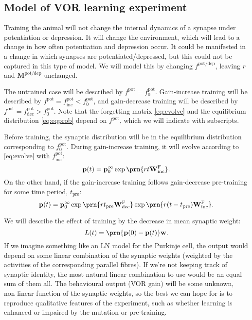 \documentclass[12pt]{article}
\newcommand{\pr}{\mathbf{p}}
\newcommand{\eq}{\pr^\infty}
\newcommand{\w}{\mathbf{w}}
\newcommand{\W}{\mathbf{W}}
\newcommand{\frg}{\W^\mathrm{F}}
\newcommand{\M}{\mathbf{M}}
\newcommand{\pot}{^{\text{pot}}}
\newcommand{\potdep}{^{\text{pot/dep}}}
\newcommand{\norm}{_0}
\newcommand{\inc}{_{\text{inc}}}
\newcommand{\dec}{_{\text{dec}}}
\newcommand{\tpre}{t_{\text{pre}}}
\begin{document}
\subsection{Model of VOR learning experiment}\label{sec:learning}

Training the animal will not change the internal dynamics of a synapse under potentiation or depression.
It will change the environment, which will lead to a change in how often potentiation and depression occur.
It could be manifested in a change in which synapses are potentiated/depressed, but this could not be captured in this type of model.
We will model this by changing $f\potdep$, leaving $r$ and $\M\potdep$ unchanged.

The untrained case will be described by $f\pot=f\pot\norm$.
Gain-increase training  will be described by $f\pot=f\pot\inc<f\pot\norm$, and
gain-decrease training  will be described by $f\pot=f\pot\dec>f\pot\norm$. Note that the forgetting matrix \eqref{eq:evolve} and the equilibrium distribution \eqref{eq:eqprob} depend on $f\pot$, which we will indicate with subscripts.

Before training, the synaptic distribution will be in the equilibrium distribution corresponding to $f\pot\norm$.
During gain-increase training, it will evolve according to \eqref{eq:evolve} with $f\pot\inc$:
%
\begin{equation}\label{eq:nopre}
  \pr(t) = \eq\norm \exp\prn{rt\frg\inc}.
\end{equation}
%
On the other hand, if the gain-increase training follows gain-decrease pre-training for some time period, $\tpre$:
%
\begin{equation}\label{eq:withpre}
  \pr(t) = \eq\norm \exp\prn{r\tpre\frg\dec} \exp\prn{r(t-\tpre)\frg\inc}.
\end{equation}
%

We will describe the effect of training by the decrease in mean synaptic weight:
%
\begin{equation}\label{eq:learning}
  L(t) = \prn{\pr(0)-\pr(t)}\w.
\end{equation}
%
If we imagine something like an LN model for the Purkinje cell, the output would depend on some linear combination of the synaptic weights (weighted by the activities of the corresponding parallel fibres).
If we're not keeping track of synaptic identity, the most natural linear combination to use would be an equal sum of them all.
The behavioural output (VOR gain) will be some unknown, non-linear function of the synaptic weights, so the best we can hope for is to reproduce qualitative features of the experiment, such as whether learning is enhanced or impaired by the mutation or pre-training.
\end{document}

